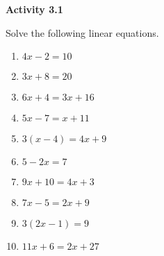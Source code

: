  \vspace{1ex}
\noindent\textbf{Activity 3.1}

\vspace{0.75ex}

Solve the following  linear equations.
\begin{multicols}{2}
\begin{enumerate}[noitemsep, label = \color{blue}\arabic*. ]
    \item $4x - 2 = 10$
    \item $3x + 8 = 20$
    \item $6x + 4 = 3x + 16$
    \item $5x - 7 = x + 11$
    \item $3(x - 4) = 4x + 9$
    \item $5 - 2x = 7$
    \item $9x + 10 = 4x + 3$
    \item $7x - 5 = 2x + 9$
    \item $3(2x - 1) = 9$
    \item $11x + 6 = 2x + 27$
\end{enumerate}
\end{multicols}

